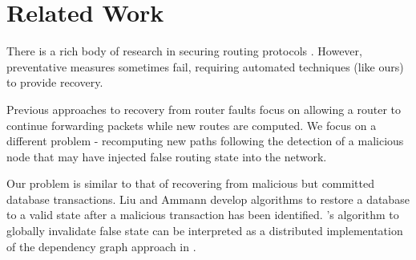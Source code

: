 \section{Related Work}
\label{sec:related}




There is a rich body of research in securing routing protocols \cite{Sead,Pei03,Smith97}.  However, preventative measures sometimes fail,
requiring automated techniques (like ours) to provide recovery.


Previous approaches to recovery from router faults \cite{Moy01,Shaikh02} focus on allowing a router to continue forwarding packets while new 
routes are computed.  We focus on a different problem - recomputing new paths following the detection of a malicious node that may have injected false routing state into the network.

Our problem is similar to that of recovering from malicious but committed database transactions. Liu \etal 
\cite{Liu98} and Ammann \etal \cite{Liu00} develop algorithms to restore a database to a valid state after a malicious transaction has been identified. 
\purges's algorithm to globally invalidate
false state can be interpreted as a distributed implementation of the dependency graph approach in \cite{Liu00}.  

